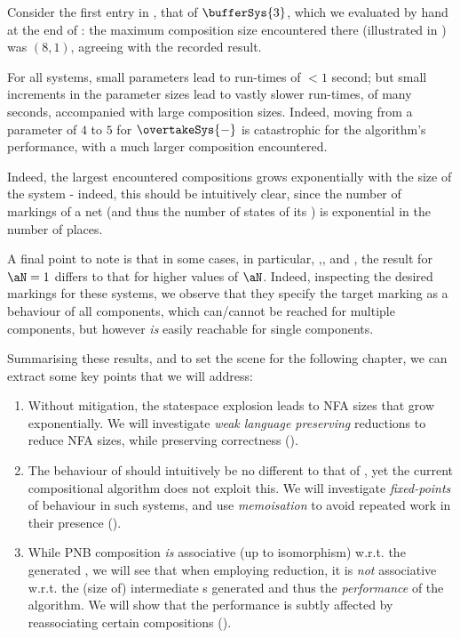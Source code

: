 

Consider the first entry in , that of $\bufferSys{3}$,
which we evaluated by hand at the end of :
the maximum composition size encountered there (illustrated in
) was $(8,1)$, agreeing with the recorded result.

For all systems, small parameters lead to run-times of $< 1$ second; but
small increments in the parameter sizes lead to vastly slower run-times, of
many seconds, accompanied with large composition sizes. Indeed, moving from a
parameter of $4$ to $5$ for $\overtakeSys{-}$ is catastrophic for the
algorithm's performance, with a much larger \TNFA{} composition encountered.

Indeed, the largest encountered compositions grows exponentially with the size
of the system - indeed, this should be intuitively clear, since the number of
markings of a net (and thus the number of states of its \TNFA{}) is exponential
in the number of places.

A final point to note is that in some cases, in particular,
\tokenringSys{-},\overtakeSys{-}, and \cyclicschedulerSys{-}, the result for
$\aN = 1$ differs to that for higher values of $\aN$. Indeed, inspecting the
desired markings for these systems, we observe that they specify the target
marking as a behaviour of all components, which can/cannot be reached for
multiple components, but however \emph{is} easily reachable for single
components.

Summarising these results, and to set the scene for the following chapter, we
can extract some key points that we will address:
\begin{enumerate}
    \item Without mitigation, the statespace explosion leads to NFA sizes that
        grow exponentially. We will investigate \emph{weak language preserving}
        reductions to reduce NFA sizes, while preserving correctness
        ().
    \item The behaviour of  should intuitively be no different to
        that of , yet the current compositional algorithm does not
        exploit this. We will investigate \emph{fixed-points} of behaviour in
        such systems, and use \emph{memoisation} to avoid repeated work in
        their presence ().
    \item While PNB composition \emph{is} associative (up to isomorphism)
        w.r.t. the generated \TNFA{}, we will see that when employing
        reduction, it is \emph{not} associative w.r.t. the (size of)
        intermediate \TNFA{}s generated and thus the \emph{performance} of the
        algorithm. We will show that the performance is subtly affected by
        reassociating certain compositions ().
\end{enumerate}
